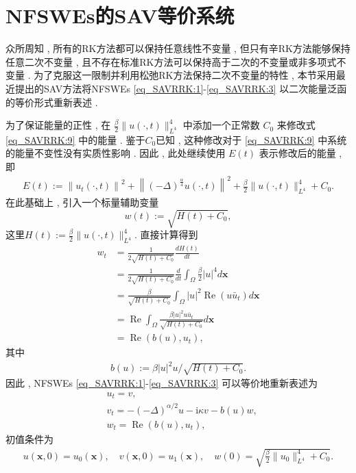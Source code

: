\section{NFSWEs的SAV等价系统}\label{Section_SAVRRK: 2}

众所周知 , 所有的RK方法都可以保持任意线性不变量 , 但只有辛RK方法能够保持任意二次不变量 , 
且不存在标准RK方法可以保持高于二次的不变量或非多项式不变量 . 
为了克服这一限制并利用松弛RK方法保持二次不变量的特性 , 本节采用最近提出的SAV方法将NFSWEs \eqref{eq_SAVRRK:1}-\eqref{eq_SAVRRK:3} 以二次能量泛函的等价形式重新表述 . 

为了保证能量的正性 , 在 $\frac{\beta}{2}\|u(\cdot , t)\|_{L^{4}}^{4}$ 中添加一个正常数 $C_0$ 来修改式 \eqref{eq_SAVRRK:9} 中的能量 . 
鉴于$C_0$已知 , 这种修改对于 \eqref{eq_SAVRRK:9} 中系统的能量不变性没有实质性影响 . 
因此 , 此处继续使用 $E(t)$ 表示修改后的能量 , 即
\begin{align}\label{eq_SAVRRK:9_1}
	E(t):=\left\|u_{t}(\cdot , t)\right\|^{2}+\left\|(-\Delta)^{\frac{\alpha}{4}} u(\cdot , t)\right\|^{2}+\frac{\beta}{2}\|u(\cdot , t)\|_{L^{4}}^{4} + C_0 . 
\end{align}
在此基础上 , 引入一个标量辅助变量
\begin{equation}
	w(t):=\sqrt{H(t)+C_0} , 
\end{equation}
这里$H(t):=\frac{\beta}{2}\|u(\cdot , t)\|_{L^{4}}^{4}  . $
直接计算得到
\begin{align}
	w_t & =\frac{1}{2 \sqrt{H(t)+C_0}} \frac{d H(t)}{d t} \nonumber\\
	& =\frac{1}{2 \sqrt{H(t)+C_0}} \frac{d}{d t} \int_{\Omega} \frac{\beta}{2}|u|^{4}d \boldsymbol{x} \nonumber\\
	& =\frac{\beta}{\sqrt{H(t)+C_0}} \int_{\Omega} |u|^2 \operatorname{Re}\left(u \bar{u}_t\right) d \boldsymbol{x}\nonumber\\
	& =\operatorname{Re} \int_{\Omega} \frac{\beta|u|^2 u \bar{u}_t}{\sqrt{H(t)+C_0}} d \boldsymbol{x} \nonumber\\
	& =\operatorname{Re}\left(b(u) , u_t\right) , \label{eq_SAVRRK:2-1}
\end{align}
其中
\begin{align}
b(u):=\beta |u|^2 u / \sqrt{H(t)+C_0} . 
\end{align}
因此 , NFSWEs \eqref{eq_SAVRRK:1}-\eqref{eq_SAVRRK:3} 可以等价地重新表述为
\begin{align}
& u_t=v , \label{eq_SAVRRK:2-2}\\
& v_t=-(-\Delta)^{\alpha / 2} u-\mathrm{i}\kappa v-b(u) w , \label{eq_SAVRRK:2-3}\\
& w_t=\operatorname{Re}\left(b(u) , u_t\right) , \label{eq_SAVRRK:2-4}
\end{align}
初值条件为
\begin{align}\label{eq_SAVRRK:31}
	u(\boldsymbol{x} , 0)=u_{0}(\boldsymbol{x}) , \quad v(\boldsymbol{x} , 0)=u_{1}(\boldsymbol{x}) , \quad w(0)=\sqrt{\frac{\beta}{2}\|u_{0}\|_{L^{4}}^{4} +C_0} . 
\end{align}

